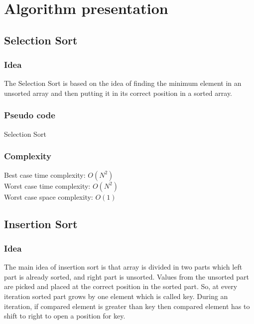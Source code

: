 \documentclass[11pt,a4paper]{article}
\newcommand\tab[1][1cm]{\hspace*{#1}}
\begin{document}
\section{Algorithm presentation}
\subsection{Selection Sort}

\subsubsection*{Idea}
\tab The Selection Sort is based on the idea of finding the minimum element in an unsorted array and then putting it in its correct position in a sorted array.

\subsubsection*{Pseudo code}
\begin{algorithm2e}
  \SetAlgoLined
  \caption{Selection Sort}
\end{algorithm2e}

\subsubsection*{Complexity}
Best case time complexity: $O(N^2)$ \\
Worst case time complexity: $O(N^2)$ \\
Worst case space complexity: $O(1)$

\subsection{Insertion Sort}
\subsubsection*{Idea}
\tab The main idea of insertion sort is that array is divided in two parts which left part is already sorted, and right part is unsorted.
Values from the unsorted part are picked and placed at the correct position in the sorted part.
So, at every iteration sorted part grows by one element which is called key.
During an iteration, if compared element is greater than key then compared element has to shift to right to open a position for key.
\end{document}
